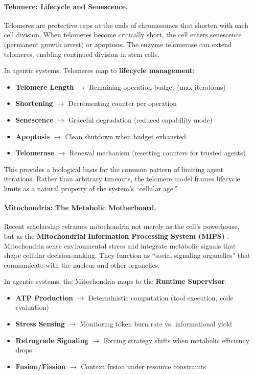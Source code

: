 \paragraph{Telomere: Lifecycle and Senescence.}
Telomeres are protective caps at the ends of chromosomes that shorten with each cell division. When telomeres become critically short, the cell enters senescence (permanent growth arrest) or apoptosis. The enzyme telomerase can extend telomeres, enabling continued division in stem cells.

In agentic systems, Telomeres map to \textbf{lifecycle management}:
\begin{itemize}[leftmargin=*]
\item \textbf{Telomere Length} $\to$ Remaining operation budget (max iterations)
\item \textbf{Shortening} $\to$ Decrementing counter per operation
\item \textbf{Senescence} $\to$ Graceful degradation (reduced capability mode)
\item \textbf{Apoptosis} $\to$ Clean shutdown when budget exhausted
\item \textbf{Telomerase} $\to$ Renewal mechanism (resetting counters for trusted agents)
\end{itemize}
This provides a biological basis for the common pattern of limiting agent iterations. Rather than arbitrary timeouts, the telomere model frames lifecycle limits as a natural property of the system's ``cellular age.''

\paragraph{Mitochondria: The Metabolic Motherboard.}
Recent scholarship reframes mitochondria not merely as the cell's powerhouse, but as the \textbf{Mitochondrial Information Processing System (MIPS)} \cite{picard2022mips}. Mitochondria sense environmental stress and integrate metabolic signals that shape cellular decision-making. They function as ``social signaling organelles'' that communicate with the nucleus and other organelles.

In agentic systems, the Mitochondria maps to the \textbf{Runtime Supervisor}:
\begin{itemize}[leftmargin=*]
\item \textbf{ATP Production} $\to$ Deterministic computation (tool execution, code evaluation)
\item \textbf{Stress Sensing} $\to$ Monitoring token burn rate vs. informational yield
\item \textbf{Retrograde Signaling} $\to$ Forcing strategy shifts when metabolic efficiency drops
\item \textbf{Fusion/Fission} $\to$ Context fusion under resource constraints
\end{itemize}

